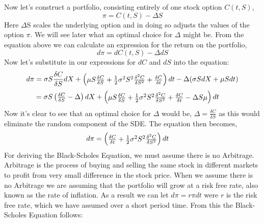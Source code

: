\documentclass[11pt]{article}
\begin{document}
Now let's construct a portfolio, consisting entirely of one stock option $C(t,S)$,
\begin{equation}
\pi = C(t,S) - \Delta S
\end{equation}
Here $\Delta$S scales the underlying option and in doing so adjusts the values of the option $\pi$. We will see later what an optimal choice for $\Delta$ might be.
From the equation above we can calculate an expression for the return on the portfolio,
\begin{equation}
d\pi = dC(t,S) - \Delta dS
\end{equation}
Now let's substitute in our expressions for $dC$ and $dS$ into the equation:
\begin{equation*}
d \pi = \sigma S \frac{\delta C}{\delta S}dX + 
\setlength{\arraycolsep}{2pt}\begin{pmatrix} \mu S \frac{\delta C}{\delta S} + \frac{1}{2}\sigma^2 S^2\frac{\delta^2 C}{\delta S^2} + \frac{\delta C}{\delta t}\end{pmatrix}dt - \Delta(\sigma S dX + \mu S dt)
\end{equation*}
\begin{equation*}
= \sigma S \setlength{\arraycolsep}{2pt}\begin{pmatrix} \frac{\delta C}{\delta S} - \Delta \end{pmatrix}dX + 
\setlength{\arraycolsep}{2pt}\begin{pmatrix} \mu S \frac{\delta C}{\delta S} + \frac{1}{2}\sigma^2 S^2\frac{\delta^2 C}{\delta S^2} + \frac{\delta C}{\delta t} - \Delta S \mu
\end{pmatrix}dt \phantom{ccc}
\end{equation*}
Now it's clear to see that an optimal choice for $\Delta$ would be, $\Delta = \frac{\delta C}{\delta S}$ as this would eliminate the random component of the SDE. The equation then becomes,
\begin{equation*}
d \pi = 
\setlength{\arraycolsep}{2pt}\begin{pmatrix}
\frac{\delta C}{\delta t} + \frac{1}{2}\sigma^2 S^2\frac{\delta^2 C}{\delta S^2}
\end{pmatrix}dt \phantom{ccc}
\end{equation*}
For deriving the Black-Scholes Equation, we must assume there is no Arbitrage. Arbitrage is the process of buying and selling the same stock in different markets to profit from very small difference in the stock price. When we assume there is no Arbitrage we are assuming that the portfolio will grow at a risk free rate, also known as the rate of inflation. As a result we can let $d \pi = r\pi dt$ were $r$ is the risk free rate, which we have assumed over a short period time. From this the Black-Scholes Equation follows:
\end{document}
